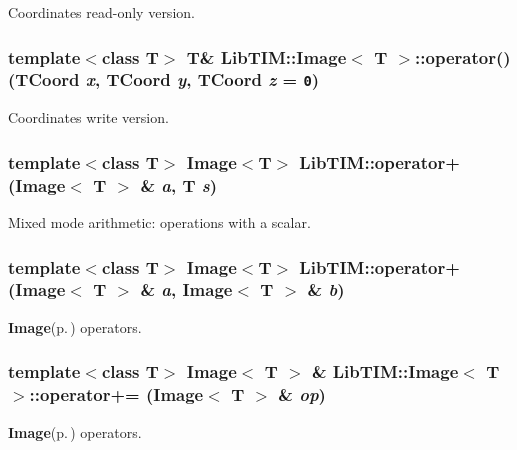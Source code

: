Coordinates read-only version. 

\subsubsection{\setlength{\rightskip}{0pt plus 5cm}template$<$class T$>$ T\& {\bf Lib\-TIM::Image}$<$ T $>$::operator() ({\bf TCoord} {\em x}, {\bf TCoord} {\em y}, {\bf TCoord} {\em z} = {\tt 0})\hspace{0.3cm}{\tt  [inline, inherited]}}\label{group__Image_ga41}


Coordinates write version. 

\subsubsection{\setlength{\rightskip}{0pt plus 5cm}template$<$class T$>$ Image$<$T$>$ Lib\-TIM::operator+ (Image$<$ T $>$ \& {\em a}, T {\em s})}\label{group__Image_ga74}


Mixed mode arithmetic: operations with a scalar. 

\subsubsection{\setlength{\rightskip}{0pt plus 5cm}template$<$class T$>$ Image$<$T$>$ Lib\-TIM::operator+ (Image$<$ T $>$ \& {\em a}, Image$<$ T $>$ \& {\em b})}\label{group__Image_ga71}


{\bf Image}{\rm (p.\,\pageref{classLibTIM_1_1Image})} operators. 

\subsubsection{\setlength{\rightskip}{0pt plus 5cm}template$<$class T$>$ Image$<$ T $>$ \& {\bf Lib\-TIM::Image}$<$ T $>$::operator+= ({\bf Image}$<$ T $>$ \& {\em op})\hspace{0.3cm}{\tt  [inherited]}}\label{group__Image_ga47}


{\bf Image}{\rm (p.\,\pageref{classLibTIM_1_1Image})} operators. 

